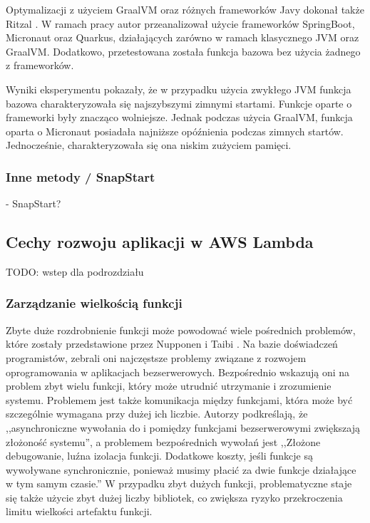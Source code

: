 Optymalizacji z użyciem GraalVM oraz różnych frameworków Javy dokonał także Ritzal \cite{ritzal2020optimizing}.
W ramach pracy autor przeanalizował użycie frameworków SpringBoot, Micronaut oraz Quarkus, działających zarówno w ramach klasycznego JVM oraz GraalVM.
Dodatkowo, przetestowana została funkcja bazowa bez użycia żadnego z frameworków.

Wyniki eksperymentu pokazały, że w przypadku użycia zwykłego JVM funkcja bazowa charakteryzowała się najszybszymi zimnymi startami.
Funkcje oparte o frameworki były znacząco wolniejsze. Jednak podczas użycia GraalVM, funkcja oparta o Micronaut posiadała najniższe opóźnienia podczas zimnych startów.
Jednocześnie, charakteryzowała się ona niskim zużyciem pamięci.

\subsubsection*{Inne metody / SnapStart}

\cite{menéndez2023performancebestpracticesusing} - SnapStart?

\subsection{Cechy rozwoju aplikacji w AWS Lambda}\label{chapter:przeglad_literatury_wyniki_cechy_rozwoju}

TODO: wstep dla podrozdziału

\subsubsection*{Zarządzanie wielkością funkcji}

Zbyte duże rozdrobnienie funkcji może powodować wiele pośrednich problemów, które zostały przedstawione przez Nupponen i Taibi \cite{9095731}.
Na bazie doświadczeń programistów, zebrali oni najczęstsze problemy związane z rozwojem oprogramowania w aplikacjach bezserwerowych.
Bezpośrednio wskazują oni na problem zbyt wielu funkcji, który może utrudnić utrzymanie i zrozumienie systemu.
Problemem jest także komunikacja między funkcjami, która może być szczególnie wymagana przy dużej ich liczbie. 
Autorzy podkreślają, że ,,asynchroniczne wywołania do i pomiędzy funkcjami bezserwerowymi zwiększają złożoność systemu''\cite{9095731}, 
a problemem bezpośrednich wywołań jest ,,Złożone debugowanie, luźna izolacja funkcji. Dodatkowe koszty, jeśli funkcje są wywoływane synchronicznie, ponieważ musimy płacić za dwie funkcje działające w tym samym czasie.''\cite{9095731}
W przypadku zbyt dużych funkcji, problematyczne staje się także użycie zbyt dużej liczby bibliotek, co zwiększa ryzyko przekroczenia limitu wielkości artefaktu funkcji.

